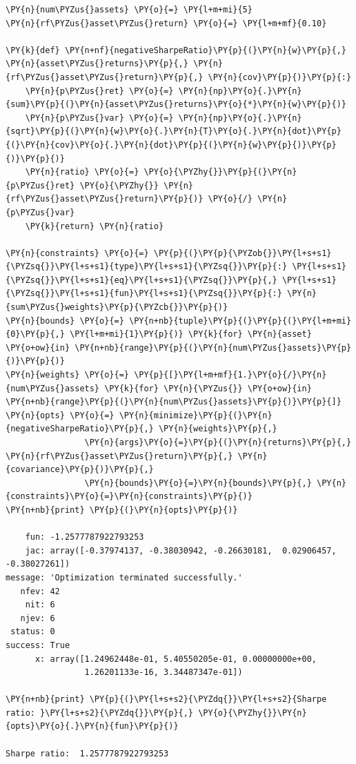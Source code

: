 \begin{codebox}
\begin{Verbatim}[commandchars=\\\{\}]
\PY{n}{num\PYZus{}assets} \PY{o}{=} \PY{l+m+mi}{5}
\PY{n}{rf\PYZus{}asset\PYZus{}return} \PY{o}{=} \PY{l+m+mf}{0.10}
		
\PY{k}{def} \PY{n+nf}{negativeSharpeRatio}\PY{p}{(}\PY{n}{w}\PY{p}{,} \PY{n}{asset\PYZus{}returns}\PY{p}{,} \PY{n}{rf\PYZus{}asset\PYZus{}return}\PY{p}{,} \PY{n}{cov}\PY{p}{)}\PY{p}{:} 
    \PY{n}{p\PYZus{}ret} \PY{o}{=} \PY{n}{np}\PY{o}{.}\PY{n}{sum}\PY{p}{(}\PY{n}{asset\PYZus{}returns}\PY{o}{*}\PY{n}{w}\PY{p}{)}
    \PY{n}{p\PYZus{}var} \PY{o}{=} \PY{n}{np}\PY{o}{.}\PY{n}{sqrt}\PY{p}{(}\PY{n}{w}\PY{o}{.}\PY{n}{T}\PY{o}{.}\PY{n}{dot}\PY{p}{(}\PY{n}{cov}\PY{o}{.}\PY{n}{dot}\PY{p}{(}\PY{n}{w}\PY{p}{)}\PY{p}{)}\PY{p}{)}
    \PY{n}{ratio} \PY{o}{=} \PY{o}{\PYZhy{}}\PY{p}{(}\PY{n}{p\PYZus{}ret} \PY{o}{\PYZhy{}} \PY{n}{rf\PYZus{}asset\PYZus{}return}\PY{p}{)} \PY{o}{/} \PY{n}{p\PYZus{}var}
    \PY{k}{return} \PY{n}{ratio}
		
\PY{n}{constraints} \PY{o}{=} \PY{p}{(}\PY{p}{\PYZob{}}\PY{l+s+s1}{\PYZsq{}}\PY{l+s+s1}{type}\PY{l+s+s1}{\PYZsq{}}\PY{p}{:} \PY{l+s+s1}{\PYZsq{}}\PY{l+s+s1}{eq}\PY{l+s+s1}{\PYZsq{}}\PY{p}{,} \PY{l+s+s1}{\PYZsq{}}\PY{l+s+s1}{fun}\PY{l+s+s1}{\PYZsq{}}\PY{p}{:} \PY{n}{sum\PYZus{}weights}\PY{p}{\PYZcb{}}\PY{p}{)}
\PY{n}{bounds} \PY{o}{=} \PY{n+nb}{tuple}\PY{p}{(}\PY{p}{(}\PY{l+m+mi}{0}\PY{p}{,} \PY{l+m+mi}{1}\PY{p}{)} \PY{k}{for} \PY{n}{asset} \PY{o+ow}{in} \PY{n+nb}{range}\PY{p}{(}\PY{n}{num\PYZus{}assets}\PY{p}{)}\PY{p}{)}
\PY{n}{weights} \PY{o}{=} \PY{p}{[}\PY{l+m+mf}{1.}\PY{o}{/}\PY{n}{num\PYZus{}assets} \PY{k}{for} \PY{n}{\PYZus{}} \PY{o+ow}{in} \PY{n+nb}{range}\PY{p}{(}\PY{n}{num\PYZus{}assets}\PY{p}{)}\PY{p}{]}
\PY{n}{opts} \PY{o}{=} \PY{n}{minimize}\PY{p}{(}\PY{n}{negativeSharpeRatio}\PY{p}{,} \PY{n}{weights}\PY{p}{,} 
                \PY{n}{args}\PY{o}{=}\PY{p}{(}\PY{n}{returns}\PY{p}{,} \PY{n}{rf\PYZus{}asset\PYZus{}return}\PY{p}{,} \PY{n}{covariance}\PY{p}{)}\PY{p}{,}
                \PY{n}{bounds}\PY{o}{=}\PY{n}{bounds}\PY{p}{,} \PY{n}{constraints}\PY{o}{=}\PY{n}{constraints}\PY{p}{)}
\PY{n+nb}{print} \PY{p}{(}\PY{n}{opts}\PY{p}{)}

    fun: -1.2577787922793253
    jac: array([-0.37974137, -0.38030942, -0.26630181,  0.02906457, -0.38027261])
message: 'Optimization terminated successfully.'
   nfev: 42
    nit: 6
   njev: 6
 status: 0
success: True
      x: array([1.24962448e-01, 5.40550205e-01, 0.00000000e+00, 
                1.26201133e-16, 3.34487347e-01])

\PY{n+nb}{print} \PY{p}{(}\PY{l+s+s2}{\PYZdq{}}\PY{l+s+s2}{Sharpe ratio: }\PY{l+s+s2}{\PYZdq{}}\PY{p}{,} \PY{o}{\PYZhy{}}\PY{n}{opts}\PY{o}{.}\PY{n}{fun}\PY{p}{)}

Sharpe ratio:  1.2577787922793253
\end{Verbatim}
\end{codebox}

